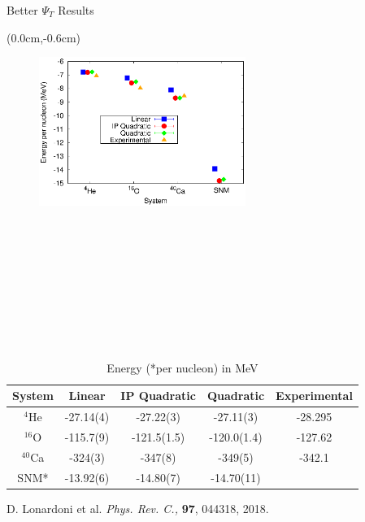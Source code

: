 \documentclass{beamer}
\begin{document}
\begin{frame}{Better $\Psi_T$ Results}
\begin{textblock*}{\textwidth}(0.0cm,-0.6cm) %
\begin{figure}[h]
   \centering
   \includegraphics[width=0.6\textwidth]{figures/energy.eps}
\end{figure}
\end{textblock*}
~\\~\\~\\~\\~\\~\\~\\~\\
\tiny
\begin{table}[htb]
\centering
\caption[]{Energy (*per nucleon) in MeV}
\begin{tabular}{ccccc}
\hline\hline
System & Linear & IP Quadratic & Quadratic & Experimental\\
\hline
${}^{4}${He}   & -27.14(4) & -27.22(3)    & -27.11(3)    & -28.295   \\  
${}^{16}${O}   & -115.7(9) & -121.5(1.5)  & -120.0(1.4)  & -127.62   \\  
${}^{40}${Ca}  & -324(3)   & -347(8)      & -349(5)      & -342.1     \\  
SNM*           & -13.92(6) & -14.80(7)    & -14.70(11)   &           \\  
\hline\hline
\end{tabular}
\label{tab:psi2}
\end{table}
{\tiny D. Lonardoni et al. \textit{Phys. Rev. C.,} \textbf{97}, 044318, 2018.}
\end{frame}
\end{document}
